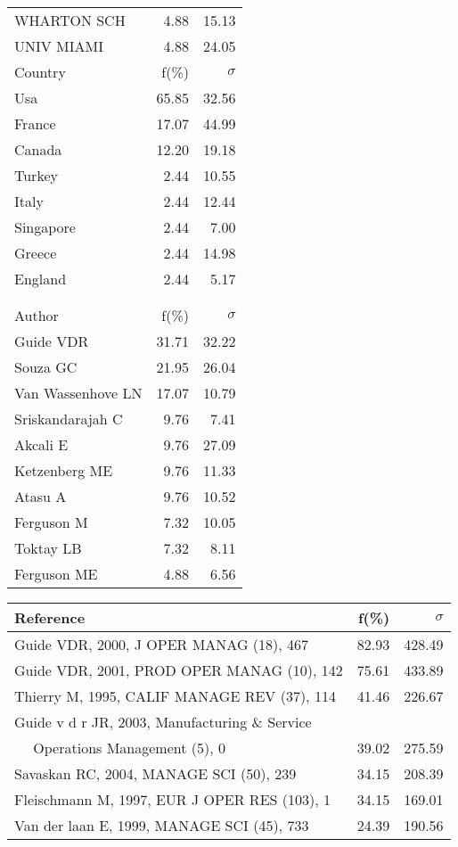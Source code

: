 \documentclass[a4paper,11pt]{report}
\begin{document}
\begin{landscape}
\begin{table}[!ht]
{\begin{tabular}{|l r r|}
WHARTON SCH & 4.88 & 15.13\\
UNIV MIAMI & 4.88 & 24.05\\
\hline
\hline
Country & f(\%) & $\sigma$\\
\hline
Usa & 65.85 & 32.56\\
France & 17.07 & 44.99\\
Canada & 12.20 & 19.18\\
Turkey & 2.44 & 10.55\\
Italy & 2.44 & 12.44\\
Singapore & 2.44 & 7.00\\
Greece & 2.44 & 14.98\\
England & 2.44 & 5.17\\
 &  & \\
 &  & \\
\hline
\hline
Author & f(\%) & $\sigma$\\
\hline
Guide VDR & 31.71 & 32.22\\
Souza GC & 21.95 & 26.04\\
Van Wassenhove LN & 17.07 & 10.79\\
Sriskandarajah C & 9.76 & 7.41\\
Akcali E & 9.76 & 27.09\\
Ketzenberg ME & 9.76 & 11.33\\
Atasu A & 9.76 & 10.52\\
Ferguson M & 7.32 & 10.05\\
Toktay LB & 7.32 & 8.11\\
Ferguson ME & 4.88 & 6.56\\
\hline
\end{tabular}
}
{\scriptsize\begin{tabular}{|l r r|}
\hline
Reference & f(\%) & $\sigma$\\
\hline
Guide VDR, 2000, J OPER MANAG (18), 467 & 82.93 & 428.49\\
Guide VDR, 2001, PROD OPER MANAG (10), 142 & 75.61 & 433.89\\
Thierry M, 1995, CALIF MANAGE REV (37), 114 & 41.46 & 226.67\\
Guide v d r  JR, 2003, Manufacturing \& Service &  & \\
$\quad$ Operations Management (5), 0 & 39.02 & 275.59\\
Savaskan RC, 2004, MANAGE SCI (50), 239 & 34.15 & 208.39\\
Fleischmann M, 1997, EUR J OPER RES (103), 1 & 34.15 & 169.01\\
Van der laan E, 1999, MANAGE SCI (45), 733 & 24.39 & 190.56\\

\end{tabular}}
\end{table}
\end{landscape}
\end{document}
